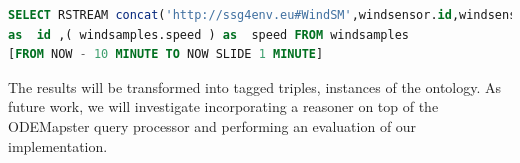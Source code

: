 \documentclass[runningheads,a4paper]{llncs}
\begin{document}
\begin{lstlisting}[style=HaskellSNEE,language=SQL,frame=none]
SELECT RSTREAM concat('http://ssg4env.eu#WindSM',windsensor.id,windsensor.ts )
as  id ,( windsamples.speed ) as  speed FROM windsamples
[FROM NOW - 10 MINUTE TO NOW SLIDE 1 MINUTE]
\end{lstlisting}
%
\vspace{-3pt}
The results will be transformed into tagged triples, instances of the ontology. As future work, we will investigate incorporating a reasoner on top of the ODEMapster query processor and performing an evaluation of our implementation.

\vspace{-12pt}

%

%
%







\end{document}
